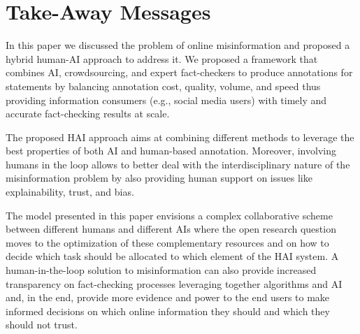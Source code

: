 \documentclass[11pt]{article}
\begin{document}
\section{Take-Away Messages}
\label{sec:take-away}

In this paper we discussed the problem of online misinformation and proposed a hybrid human-AI approach to address it.
% 
We proposed a framework that combines AI, crowdsourcing, and expert fact-checkers to produce annotations for statements by balancing annotation cost, quality, volume, and speed thus providing information consumers (e.g., social media users) with timely and accurate fact-checking results at scale.

The proposed HAI approach aims at combining different methods to leverage the best properties of both AI and human-based annotation. Moreover, involving humans in the loop allows to better deal with the interdisciplinary nature of the misinformation problem by also providing human support on issues like explainability, trust, and bias.

The  model presented in this paper envisions a complex collaborative scheme between different humans and different AIs where the open research question moves to the optimization of these complementary resources and on how to decide which task should be allocated to which element of the HAI system.
A human-in-the-loop solution to misinformation can also provide increased transparency on  fact-checking processes leveraging together algorithms and AI and, in the end, provide more evidence and power to the end users to make informed decisions on which online information they should and which they should  not  trust.
\end{document}
